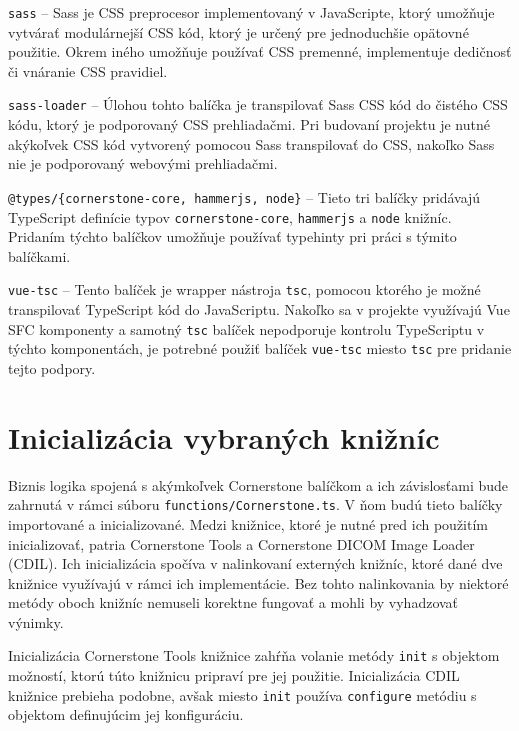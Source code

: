 \clearpage

\texttt{sass} -- Sass je CSS preprocesor implementovaný v JavaScripte, ktorý umožňuje vytvárať modulárnejší CSS kód, ktorý je určený pre jednoduchšie opätovné použitie. Okrem iného umožňuje používať CSS premenné, implementuje dedičnosť či vnáranie CSS pravidiel.

\texttt{sass-loader} -- Úlohou tohto balíčka je transpilovať Sass CSS kód do čistého CSS kódu, ktorý je podporovaný CSS prehliadačmi. Pri budovaní projektu je nutné akýkoľvek CSS kód vytvorený pomocou Sass transpilovať do CSS, nakoľko Sass nie je podporovaný webovými prehliadačmi.

\texttt{@types/\{cornerstone-core, hammerjs, node\}} -- Tieto tri balíčky pridávajú TypeScript definície typov \texttt{cornerstone-core}, \texttt{hammerjs} a \texttt{node} knižníc. Pridaním týchto balíčkov umožňuje používať typehinty pri práci s týmito balíčkami.

\texttt{vue-tsc} -- Tento balíček je wrapper nástroja \texttt{tsc}, pomocou ktorého je možné transpilovať TypeScript kód do JavaScriptu. Nakoľko sa v projekte využívajú Vue SFC komponenty a samotný \texttt{tsc} balíček nepodporuje kontrolu TypeScriptu v týchto komponentách, je potrebné použiť balíček \texttt{vue-tsc} miesto \texttt{tsc} pre pridanie tejto podpory. 

\section {Inicializácia vybraných knižníc}
Biznis logika spojená s akýmkoľvek Cornerstone balíčkom a ich závislosťami bude zahrnutá v rámci súboru \texttt{functions/Cornerstone.ts}. V ňom budú tieto balíčky importované a inicializované. Medzi knižnice, ktoré je nutné pred ich použitím inicializovať, patria Cornerstone Tools a Cornerstone DICOM Image Loader (CDIL). Ich inicializácia spočíva v nalinkovaní externých knižníc, ktoré dané dve knižnice využívajú v rámci ich implementácie. Bez tohto nalinkovania by niektoré metódy oboch knižníc nemuseli korektne fungovať a mohli by vyhadzovať výnimky.

Inicializácia Cornerstone Tools knižnice zahŕňa volanie metódy \texttt{init} s objektom možností, ktorú túto knižnicu pripraví pre jej použitie. Inicializácia CDIL knižnice prebieha podobne, avšak miesto  \texttt{init} používa \texttt{configure} metódiu s objektom definujúcim jej konfiguráciu.

